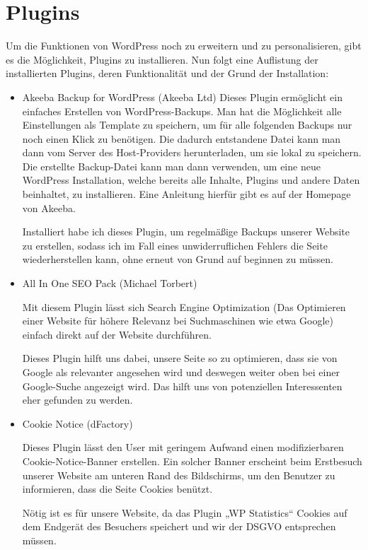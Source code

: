 \section{Plugins}
Um die Funktionen von WordPress noch zu erweitern und zu personalisieren, gibt es die Möglichkeit, Plugins zu installieren. Nun folgt eine Auflistung der installierten Plugins, deren Funktionalität und der Grund der Installation:
\begin{itemize}
    \item Akeeba Backup for WordPress (Akeeba Ltd) \citep{website:Akeeba}
    Dieses Plugin ermöglicht ein einfaches Erstellen von WordPress-Backups. Man hat die Möglichkeit alle Einstellungen als Template zu speichern, um für alle folgenden Backups nur noch einen Klick zu benötigen. Die dadurch entstandene Datei kann man dann vom Server des Host-Providers herunterladen, um sie lokal zu speichern.
    Die erstellte Backup-Datei kann man dann verwenden, um eine neue WordPress Installation, welche bereits alle Inhalte, Plugins und andere Daten beinhaltet, zu installieren.
    Eine Anleitung hierfür gibt es auf der Homepage von Akeeba. \citep{website:AkeebaInstructions}

    Installiert habe ich dieses Plugin, um regelmäßige Backups unserer Website zu erstellen, sodass ich im Fall eines unwiderruflichen Fehlers die Seite wiederherstellen kann, ohne erneut von Grund auf beginnen zu müssen.
    \item All In One SEO Pack (Michael Torbert) \citep{website:AllInOneSEO}

    Mit diesem Plugin lässt sich Search Engine Optimization (Das Optimieren einer Website für höhere Relevanz bei Suchmaschinen wie etwa Google) einfach direkt auf der Website durchführen.

    Dieses Plugin hilft uns dabei, unsere Seite so zu optimieren, dass sie von Google als relevanter angesehen wird und deswegen weiter oben bei einer Google-Suche angezeigt wird. Das hilft uns von potenziellen Interessenten eher gefunden zu werden.

    \item Cookie Notice (dFactory) \citep{website:CookieNotice}

    Dieses Plugin lässt den User mit geringem Aufwand einen modifizierbaren Cookie-Notice-Banner erstellen. Ein solcher Banner erscheint beim Erstbesuch unserer Website am unteren Rand des Bildschirms, um den Benutzer zu informieren, dass die Seite Cookies benützt.

    Nötig ist es für unsere Website, da das Plugin „WP Statistics“ Cookies auf dem Endgerät des Besuchers speichert und wir der DSGVO entsprechen müssen.


\end{itemize}
